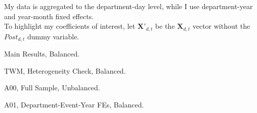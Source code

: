 \documentclass[12pt,a4paper]{article}
\begin{document}
My data is aggregated to the department-day level, while I use department-year and year-month fixed effects. \\

To highlight my coefficients of interest, let $\boldsymbol{X'}_{d,t}$ be the $\boldsymbol{X}_{d,t}$ vector without the $Post_{d,t}$ dummy variable.  



\newpage 
Main Results, Balanced. \\ 

\begin{center}

\end{center}

\begin{center}

\end{center}



\newpage 
TWM, Heterogeneity Check, Balanced. \\ 

\begin{center}

\end{center}

\begin{center}

\end{center}



\newpage 
A00, Full Sample, Unbalanced. \\ 

\begin{center}

\end{center}

\begin{center}

\end{center}



\newpage 
A01, Department-Event-Year FEs, Balanced. \\ 

\begin{center}

\end{center}

\begin{center}

\end{center}
\end{document}
